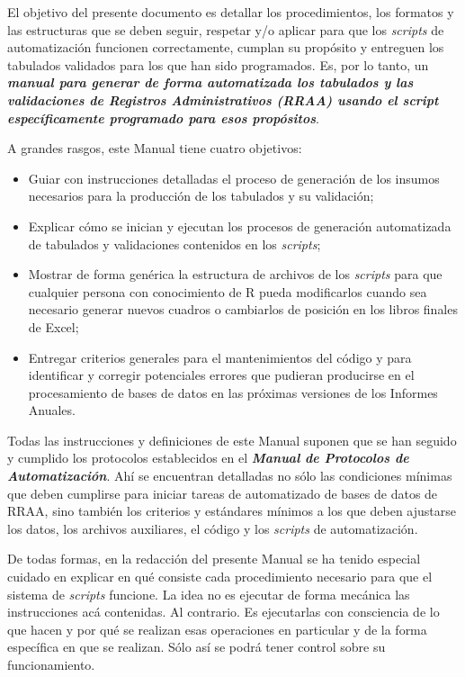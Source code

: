\documentclass[
  spanish,
]{book}
\begin{document}
El objetivo del presente documento es detallar los procedimientos, los formatos y las estructuras que se deben seguir, respetar y/o aplicar para que los \emph{scripts} de automatización funcionen correctamente, cumplan su propósito y entreguen los tabulados validados para los que han sido programados. Es, por lo tanto, un \textbf{\emph{manual para generar de forma automatizada los tabulados y las validaciones de Registros Administrativos (RRAA) usando el script específicamente programado para esos propósitos}}.

A grandes rasgos, este Manual tiene cuatro objetivos:

\begin{itemize}
\item
  Guiar con instrucciones detalladas el proceso de generación de los insumos necesarios para la producción de los tabulados y su validación;
\item
  Explicar cómo se inician y ejecutan los procesos de generación automatizada de tabulados y validaciones contenidos en los \emph{scripts};
\item
  Mostrar de forma genérica la estructura de archivos de los \emph{scripts} para que cualquier persona con conocimiento de R pueda modificarlos cuando sea necesario generar nuevos cuadros o cambiarlos de posición en los libros finales de Excel;
\item
  Entregar criterios generales para el mantenimientos del código y para identificar y corregir potenciales errores que pudieran producirse en el procesamiento de bases de datos en las próximas versiones de los Informes Anuales.
\end{itemize}

Todas las instrucciones y definiciones de este Manual suponen que se han seguido y cumplido los protocolos establecidos en el \textbf{\emph{Manual de Protocolos de Automatización}}. Ahí se encuentran detalladas no sólo las condiciones mínimas que deben cumplirse para iniciar tareas de automatizado de bases de datos de RRAA, sino también los criterios y estándares mínimos a los que deben ajustarse los datos, los archivos auxiliares, el código y los \emph{scripts} de automatización.

De todas formas, en la redacción del presente Manual se ha tenido especial cuidado en explicar en qué consiste cada procedimiento necesario para que el sistema de \emph{scripts} funcione. La idea no es ejecutar de forma mecánica las instrucciones acá contenidas. Al contrario. Es ejecutarlas con consciencia de lo que hacen y por qué se realizan esas operaciones en particular y de la forma específica en que se realizan. Sólo así se podrá tener control sobre su funcionamiento.
\end{document}
